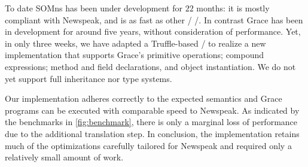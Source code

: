 



To date SOMns has been under development for $22$ months: it is mostly compliant with Newspeak, and is as fast as other \JITing/ \vms/. In contrast Grace has been in development for around five years, without consideration of performance. Yet, in only three weeks, we have adapted a Truffle-based \vm/ to realize a new implementation that supports Grace's primitive operations; compound expressions; method and field declarations, and object instantiation. We do not yet support full inheritance nor type systems.

Our implementation adheres correctly to the expected semantics and Grace programs can be executed with comparable speed to Newspeak. As indicated by the benchmarks in \autoref{fig:benchmark}, there is only a marginal loss of performance due to the additional translation step. In conclusion, the implementation retains much of the optimizations carefully tailored for Newspeak and required only a relatively small amount of work.



